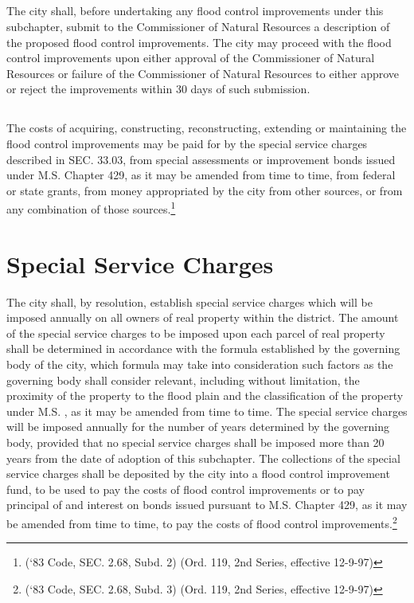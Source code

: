 \subsection{}
The city shall, before undertaking any flood control improvements under this subchapter, submit to the Commissioner of Natural Resources a description of the proposed flood control improvements.  The city may proceed with the flood control improvements upon either  approval of the Commissioner of Natural Resources or failure of the Commissioner of Natural Resources to either approve or reject the improvements within 30 days of such submission.
\subsection{}
The costs of acquiring, constructing, reconstructing, extending or maintaining the flood control improvements may be paid for by the special service charges described in SEC. 33.03, from special assessments or improvement bonds issued under M.S. Chapter 429, as it may be amended from time to time, from federal or state grants, from money appropriated by the city from other sources, or from any combination of those sources.\footnote{(‘83 Code, SEC. 2.68, Subd. 2)  (Ord. 119, 2nd Series, effective 12-9-97)}

\section{Special Service Charges}
The city shall, by resolution, establish special service charges which will be imposed annually on all owners of real property within the district. The amount of the special service charges to be imposed upon each parcel of real property shall be determined in accordance with the formula established by the governing body of the city, which formula may take into consideration such factors as the governing body shall consider relevant, including without limitation, the proximity of the property to the flood plain and the classification of the property under M.S. , as it may be amended from time to time. The special service charges will be imposed annually for the number of years determined by the governing body, provided that no special service charges shall be imposed more than 20 years from the date of adoption of this subchapter. The collections of the special service charges shall be deposited by the city into a flood control improvement fund, to be used to pay the costs of flood control improvements or to pay principal of and interest on bonds issued pursuant to M.S. Chapter 429, as it may be amended from time to time, to pay the costs of flood control improvements.\footnote{(‘83 Code, SEC. 2.68, Subd. 3)  (Ord. 119, 2nd Series, effective 12-9-97)}



